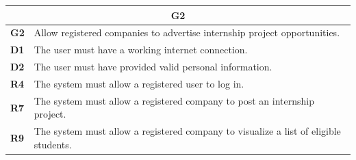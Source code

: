 \begin{table}[H]
    \centering
    \begin{tabular}{|l|m{10cm}|}
        \hline \multicolumn{2}{|c|}{\textbf{G2}} \\
        \hline \textbf{G2} & Allow registered companies to advertise internship project opportunities. \\
        \hline \textbf{D1} & The user must have a working internet connection. \\
        \hline \textbf{D2} & The user must have provided valid personal information. \\
        \hline \textbf{R4} & The system must allow a registered user to log in. \\
        \hline \textbf{R7} & The system must allow a registered company to post an internship project. \\
        \hline \textbf{R9} & The system must allow a registered company to visualize a list of eligible students. \\

\end{tabular}
\end{table}
